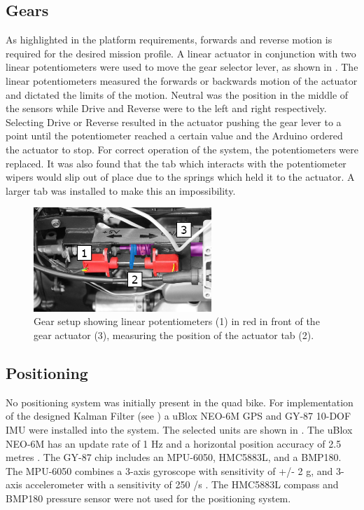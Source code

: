 \documentclass[main.tex]{subfiles}
\begin{document}
\subsection{Gears}
As highlighted in the platform requirements, forwards and reverse motion is required for the desired mission profile. A linear actuator in conjunction with two linear potentiometers were used to move the gear selector lever, as shown in . The linear potentiometers measured the forwards or backwards motion of the actuator and dictated the limits of the motion. Neutral was the position in the middle of the sensors while Drive and Reverse were to the left and right respectively. Selecting Drive or Reverse resulted in the actuator pushing the gear lever to a point until the potentiometer reached a certain value and the Arduino ordered the actuator to stop. For correct operation of the system, the potentiometers were replaced. It was also found that the tab which interacts with the potentiometer wipers would slip out of place due to the springs which held it to the actuator. A larger tab was installed to make this an impossibility.
\begin{figure}[ht]
\includegraphics[width=0.6\textwidth]{4-DetailedDesign/gearSetupFixed.jpg}
\centering
\caption[Gear system setup]{Gear setup showing linear potentiometers (1) in red in front of the gear actuator (3), measuring the position of the actuator tab (2).} 
\end{figure}
\subsection{Positioning}
No positioning system was initially present in the quad bike. For implementation of the designed Kalman Filter (see ) a uBlox NEO-6M GPS and GY-87 10-DOF IMU were installed into the system. The selected units are shown in . The uBlox NEO-6M has an update rate of 1 Hz and a horizontal position accuracy of 2.5 metres \parencite{ublox2011}. The GY-87 chip includes an MPU-6050, HMC5883L, and a BMP180. The MPU-6050 combines a 3-axis gyroscope with sensitivity of +/- 2 g, and 3-axis accelerometer with a sensitivity of 250 \degree/s \parencite{invensense2013}. The HMC5883L compass and BMP180 pressure sensor were not used for the positioning system.
\end{document}
